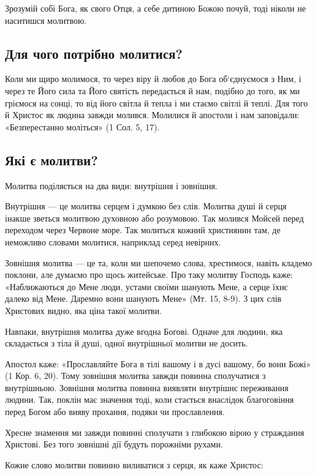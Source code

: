 \documentclass[main.tex]{subfiles}
\begin{document}
Зрозумій собі Бога, як свого Отця, а себе дитиною Божою почуй, тоді ніколи не наситишся молитвою.

\subsection{Для чого потрібно молитися?}

Коли ми щиро молимося, то через віру й любов до Бога об`єднуємося з Ним, і через те Його сила та Його святість передається й нам, подібно до того, як ми гріємося на сонці, то від його світла й тепла і ми стаємо світлі й теплі. Для того й Христос як людина завжди молився. Молилися й апостоли і нам заповідали: «Безперестанно моліться» (1 Сол. 5, 17).

\subsection{Які є молитви?}

Молитва поділяється на два види: внутрішня і зовнішня.

Внутрішня — це молитва серцем і думкою без слів. Молитва душі й серця інакше зветься молитвою духовною або розумовою. Так молився Мойсей перед переходом через Червоне море. Так молиться кожний християнин там, де неможливо словами молитися, наприклад серед невірних.

Зовнішня молитва — це та, коли ми шепочемо слова, хрестимося, навіть кладемо поклони, але думаємо про щось житейське. Про таку молитву Господь каже: «Наближаються до Мене люди, устами своїми шанують Мене, а серце їхнє далеко від Мене. Даремно вони шанують Мене» (Мт. 15, 8-9). З цих слів Христових видно, яка ціна такої молитви.

Навпаки, внутрішня молитва дуже вгодна Богові. Одначе для людини, яка складається з тіла й душі, одної внутрішньої молитви не досить.

Апостол каже: «Прославляйте Бога в тілі вашому і в дусі вашому, бо вони Божі» (1 Кор. 6, 20). Тому зовнішня молитва завжди повинна сполучатися з внутрішньою. Зовнішня молитва повинна виявляти внутрішнє переживання людини. Так, поклін має значення тоді, коли стається внаслідок благоговіння перед Богом або вияву прохання, подяки чи прославлення.

Хресне знамення ми завжди повинні сполучати з глибокою вірою у страждання Христові. Без того зовнішні дії будуть порожніми рухами.

Кожне слово молитви повинно виливатися з серця, як каже Христос:
\end{document}
